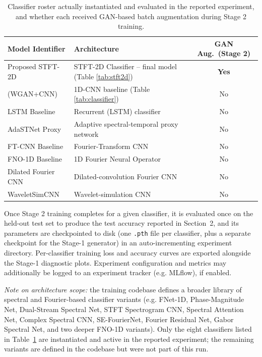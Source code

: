 \documentclass[12pt]{article}
\begin{document}
\begin{table}[H]
\centering
\caption{Classifier roster actually instantiated and evaluated in the reported experiment, and whether each received GAN-based batch augmentation during Stage 2 training.}
\label{tab:models}
\begin{tabularx}{\textwidth}{@{}l X c@{}}
\toprule
\textbf{Model Identifier} & \textbf{Architecture} & \textbf{GAN Aug.\ (Stage 2)} \\
\midrule
Proposed STFT-2D & STFT-2D Classifier -- final model (Table \ref{tab:stft2d}) & \textbf{Yes} \\
(WGAN+CNN) & 1D-CNN baseline (Table \ref{tab:classifier}) & No \\
LSTM Baseline & Recurrent (LSTM) classifier & No \\
AdaSTNet Proxy & Adaptive spectral-temporal proxy network & No \\
FT-CNN Baseline & Fourier-Transform CNN & No \\
FNO-1D Baseline & 1D Fourier Neural Operator & No \\
Dilated Fourier CNN & Dilated-convolution Fourier CNN & No \\
WaveletSimCNN & Wavelet-simulation CNN & No \\
\bottomrule
\end{tabularx}
\end{table}

Once Stage 2 training completes for a given classifier, it is evaluated once on the held-out test set to produce the test accuracy reported in Section~2, and its parameters are checkpointed to disk (one \texttt{.pth} file per classifier, plus a separate checkpoint for the Stage-1 generator) in an auto-incrementing experiment directory. Per-classifier training loss and accuracy curves are exported alongside the Stage-1 diagnostic plots. Experiment configuration and metrics may additionally be logged to an experiment tracker (e.g. MLflow), if enabled.

\emph{Note on architecture scope:} the training codebase defines a broader library of spectral and Fourier-based classifier variants (e.g. FNet-1D, Phase-Magnitude Net, Dual-Stream Spectral Net, STFT Spectrogram CNN, Spectral Attention Net, Complex Spectral CNN, SE-FourierNet, Fourier Residual Net, Gabor Spectral Net, and two deeper FNO-1D variants). Only the eight classifiers listed in Table~\ref{tab:models} are instantiated and active in the reported experiment; the remaining variants are defined in the codebase but were not part of this run.
\end{document}
